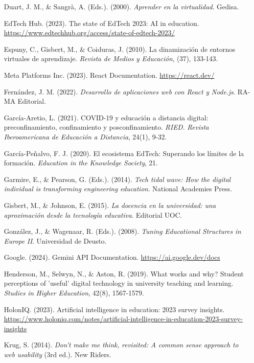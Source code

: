 \documentclass[12pt,a4paper]{report}
\begin{document}
\begin{thebibliography}{99}
Duart, J. M., \& Sangrà, A. (Eds.). (2000). \textit{Aprender en la virtualidad}. Gedisa.

EdTech Hub. (2023). The state of EdTech 2023: AI in education. \url{https://www.edtechhub.org/access/state-of-edtech-2023/}

Espuny, C., Gisbert, M., \& Coiduras, J. (2010). La dinamización de entornos virtuales de aprendizaje. \textit{Revista de Medios y Educación}, (37), 133-143.

Meta Platforms Inc. (2023). React Documentation. \url{https://react.dev/}

Fernández, J. M. (2022). \textit{Desarrollo de aplicaciones web con React y Node.js}. RA-MA Editorial.

García-Aretio, L. (2021). COVID-19 y educación a distancia digital: preconfinamiento, confinamiento y posconfinamiento. \textit{RIED. Revista Iberoamericana de Educación a Distancia}, 24(1), 9-32.

García-Peñalvo, F. J. (2020). El ecosistema EdTech: Superando los límites de la formación. \textit{Education in the Knowledge Society}, 21.

Garmire, E., \& Pearson, G. (Eds.). (2014). \textit{Tech tidal wave: How the digital individual is transforming engineering education}. National Academies Press.

Gisbert, M., \& Johnson, E. (2015). \textit{La docencia en la universidad: una aproximación desde la tecnología educativa}. Editorial UOC.

González, J., \& Wagenaar, R. (Eds.). (2008). \textit{Tuning Educational Structures in Europe II}. Universidad de Deusto.

Google. (2024). Gemini API Documentation. \url{https://ai.google.dev/docs}

Henderson, M., Selwyn, N., \& Aston, R. (2019). What works and why? Student perceptions of 'useful' digital technology in university teaching and learning. \textit{Studies in Higher Education}, 42(8), 1567-1579.

HolonIQ. (2023). Artificial intelligence in education: 2023 survey insights. \url{https://www.holoniq.com/notes/artificial-intelligence-in-education-2023-survey-insights}

Krug, S. (2014). \textit{Don't make me think, revisited: A common sense approach to web usability} (3rd ed.). New Riders.


\end{thebibliography}
\end{document}
